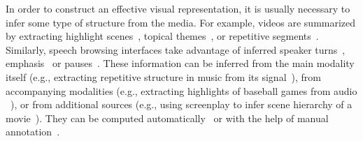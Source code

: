 \begin{mldescription}
 In order to construct an effective visual representation, it is usually necessary to infer some type of structure from the media. For example, videos are summarized by extracting highlight scenes~\cite{chen2011formulating,fleischman2007temporal}, topical themes~\cite{wu2006threading}, or repetitive segments~\cite{Chu_2015_CVPR,Zhao_2014_CVPR}. Similarly, speech browsing interfaces take advantage of inferred speaker turns~\cite{wilcox1994segmentation}, emphasis~\cite{arons1994interactively} or pauses~\cite{arons1997speechskimmer}. These information can be inferred from the main modality itself (e.g., extracting repetitive structure in music from its signal~\cite{cooper2003summarizing}), from accompanying modalities (e.g., extracting highlights of baseball games from audio ~\cite{rui2000automatically}), or from additional sources (e.g., using screenplay to infer scene hierarchy of a movie~\cite{cour2008movie,pavel2015sceneskim}). They can be computed automatically~\cite{cooper2003summarizing,rui2000automatically,pavel2015sceneskim} or with the help of manual annotation~\cite{chi2013democut,pavel2014video}.\\
\end{mldescription}

